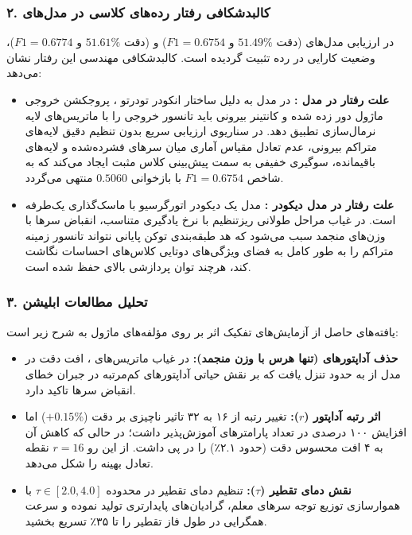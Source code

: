 \subsubsection*{۲. کالبدشکافی رفتار رده‌های کلاسی در مدل‌های }
در ارزیابی مدل‌های  (دقت $51.49\%$ و $F1 = 0.6754$) و  (دقت $51.61\%$ و $F1 = 0.6774$)، وضعیت کارایی در رده  تثبیت گردیده است. کالبدشکافی مهندسی این رفتار نشان می‌دهد:
\begin{itemize}
    \item \textbf{علت رفتار در مدل :} در مدل  به دلیل ساختار انکودر تودرتو ، پروجکشن خروجی  ماژول دور زده شده و کانتینر بیرونی  باید تانسور خروجی را با ماتریس‌های لایه نرمال‌سازی تطبیق دهد. در سناریوی ارزیابی سریع بدون تنظیم دقیق  لایه‌های متراکم بیرونی، عدم تعادل مقیاس آماری میان سرهای فشرده‌شده و لایه‌های باقیمانده، سوگیری خفیفی به سمت پیش‌بینی کلاس مثبت ایجاد می‌کند که به شاخص $F1 = 0.6754$ با بازخوانی $0.5060$ منتهی می‌گردد.
    \item \textbf{علت رفتار در مدل دیکودر :} مدل  یک دیکودر اتورگرسیو با ماسک‌گذاری یک‌طرفه است. در غیاب مراحل طولانی ریزتنظیم با نرخ یادگیری متناسب، انقباض سرها با وزن‌های منجمد سبب می‌شود که هد طبقه‌بندی توکن پایانی نتواند تانسور زمینه متراکم را به طور کامل به فضای ویژگی‌های دوتایی کلاس‌های احساسات نگاشت کند، هرچند توان پردازشی بالای  حفظ شده است.
\end{itemize}

\subsubsection*{۳. تحلیل مطالعات ابلیشن }
یافته‌های حاصل از آزمایش‌های تفکیک اثر بر روی مؤلفه‌های ماژول به شرح زیر است:
\begin{itemize}
    \item \textbf{حذف آداپتورهای  (تنها هرس با وزن منجمد):} در غیاب ماتریس‌های ، افت دقت در مدل  از  به حدود  تنزل یافت که بر نقش حیاتی آداپتورهای کم‌مرتبه در جبران خطای انقباض سرها تاکید دارد.
    \item \textbf{اثر رتبه آداپتور ($r$):} تغییر رتبه  از ۱۶ به ۳۲ تاثیر ناچیزی بر دقت ($+0.15\%$) اما افزایش ۱۰۰ درصدی در تعداد پارامترهای آموزش‌پذیر داشت؛ در حالی که کاهش آن به ۴ افت محسوس دقت (حدود ۲.۱٪) را در پی داشت. از این رو $r=16$ نقطه تعادل بهینه را شکل می‌دهد.
    \item \textbf{نقش دمای تقطیر ($\tau$):} تنظیم دمای تقطیر در محدوده $\tau \in [2.0, 4.0]$ با هموارسازی توزیع توجه سرهای معلم، گرادیان‌های پایدارتری تولید نموده و سرعت همگرایی در طول فاز تقطیر را تا ۳۵٪ تسریع بخشید.
\end{itemize}

